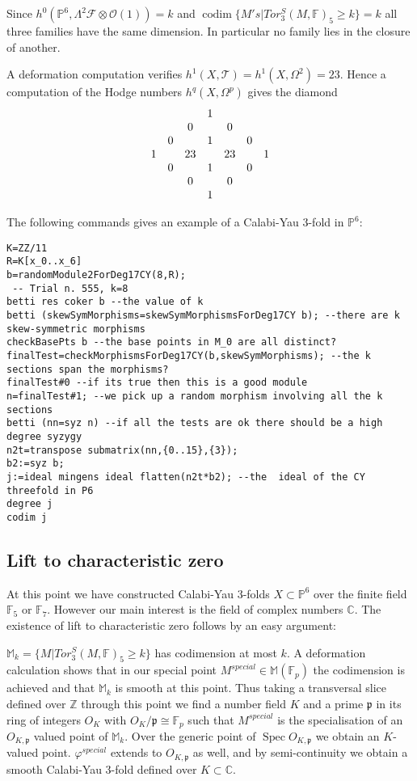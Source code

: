 \documentclass[12pt,leqno]{amsart}
\newcommand{\CC}{{\mathbb C}}
\newcommand{\FF}{{\mathbb F}}
\newcommand{\MM}{{\mathbb M}}
\newcommand{\PP}{{\mathbb P}}
\newcommand{\ZZ}{{\mathbb Z}}
\newcommand{\kf}{{\mathcal F}}
\newcommand{\ko}{{\mathcal O}}
\newcommand{\kt}{{\mathcal T}}
\newcommand{\tensor}{\otimes}
\newlength{\ho}
\DeclareMathOperator{\Spec}{Spec}
\DeclareMathOperator{\codim}{codim}
\newcommand{\gp}{\mathfrak p}
\begin{document}
Since $h^0(\PP^6,\Lambda^2 \kf \tensor \ko(1))=k$
and $\codim \{ M's | Tor^S_3(M,\FF)_5 \ge k \} =k$ all three families
have the same dimension. In particular no family lies in the closure 
of another.

A deformation computation verifies $h^1(X,\kt)=h^1(X,\Omega^2) = 23$. 
Hence a computation of the Hodge numbers $h^q(X,\Omega^p)$ gives the diamond
$$
\begin{matrix}
&&& 1 &&&\cr
&& 0 && 0 &&\cr
& 0 && 1 && 0 &\cr
 1 &&{23} &&{23} && 1\cr
& 0 && 1 && 0 &\cr
&& 0 && 0 &&\cr
&&& 1 &&&\cr 
\end{matrix}
$$



\begin{example}
The following commands gives an example of a Calabi-Yau 3-fold in $\PP^6$:
{\scriptsize
\begin{verbatim} 
K=ZZ/11
R=K[x_0..x_6]
b=randomModule2ForDeg17CY(8,R);
 -- Trial n. 555, k=8
betti res coker b --the value of k
betti (skewSymMorphisms=skewSymMorphismsForDeg17CY b); --there are k skew-symmetric morphisms
checkBasePts b --the base points in M_0 are all distinct?
finalTest=checkMorphismsForDeg17CY(b,skewSymMorphisms); --the k sections span the morphisms?
finalTest#0 --if its true then this is a good module
n=finalTest#1; --we pick up a random morphism involving all the k sections
betti (nn=syz n) --if all the tests are ok there should be a high degree syzygy
n2t=transpose submatrix(nn,{0..15},{3});
b2:=syz b;
j:=ideal mingens ideal flatten(n2t*b2); --the  ideal of the CY threefold in P6
degree j
codim j
\end{verbatim}}
\end{example}

\subsection{Lift to characteristic zero}

At this point we have constructed Calabi-Yau 3-folds $X \subset \PP^6$ over
the finite field $\FF_5$ or $\FF_7$. However our main interest is the field
of complex numbers $\CC$. The existence of lift to characteristic zero 
follows by an easy argument:

$ \MM_k=\{ M | Tor^S_3(M,\FF)_5 \ge k \}$ has codimension at most $k$.
A deformation calculation shows that in our special point
$M^{special} \in \MM(\FF_p)$ the codimension is achieved and that $\MM_k$
is smooth at this point. Thus taking a transversal slice defined over $\ZZ$
through this point we find a number field $K$ and a prime $\gp$ 
in its ring of integers $O_K$ with $O_K/\gp \cong \FF_p$ such
 that $M^{special}$ is the specialisation of an $O_{K,\gp}$ valued point
of $\MM_k$. Over the generic point of $\Spec O_{K,\gp}$ we obtain an 
$K$-valued point. $\varphi^{special}$ extends to $O_{K,\gp}$ as well,
and by semi-continuity we obtain a smooth Calabi-Yau 3-fold defined over
$K \subset \CC$.
\end{document}
